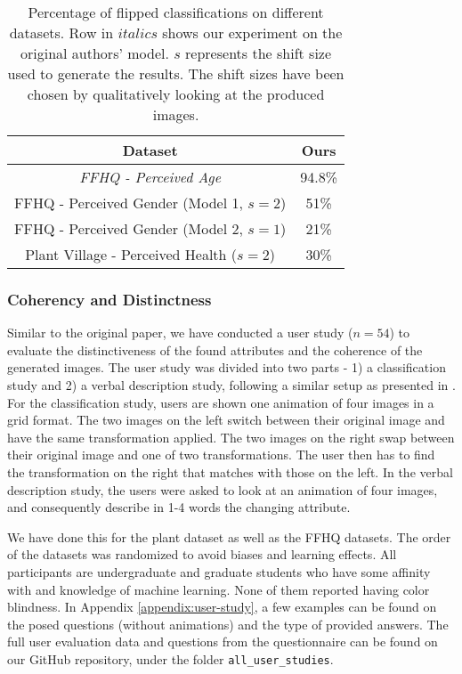 \begin{table}[h]
\centering
\begin{tabular}{ c | c{2cm} }
\toprule
\textbf{Dataset} & \textbf{Ours} \\
\midrule
\textit{FFHQ - Perceived Age} & 94.8\% \\
FFHQ - Perceived Gender (Model 1, $s=2$) & 51\% \\
FFHQ - Perceived Gender (Model 2, $s=1$) & 21\% \\
Plant Village - Perceived Health ($s=2$) & 30\% \\
\bottomrule
\end{tabular}
\caption{Percentage of flipped classifications on different datasets. Row in $italics$ shows our experiment on the original authors' model. $s$ represents the shift size used to generate the results. The shift sizes have been chosen by qualitatively looking at the produced images.}
\label{tab:sufficiency}
\end{table}


\subsubsection{Coherency and Distinctness}
Similar to the original paper, we have conducted a user study ($n=54$) to evaluate the distinctiveness of the found attributes and the coherence of the generated images. The user study was divided into two parts - 1) a classification study and 2) a verbal description study, following a similar setup as presented in \cite{yeh2020completenessaware}. For the classification study, users are shown one animation of four images in a grid format. The two images on the left switch between their original image and have the same transformation applied. The two images on the right swap between their original image and one of two transformations. The user then has to find the transformation on the right that matches with those on the left. In the verbal description study, the users were asked to look at an animation of four images, and consequently describe in 1-4 words the changing attribute.

We have done this for the plant dataset as well as the FFHQ datasets. The order of the datasets was randomized to avoid biases and learning effects. All participants are undergraduate and graduate students who have some affinity with and knowledge of machine learning. None of them reported having color blindness. In Appendix \ref{appendix:user-study}, a few examples can be found on the posed questions (without animations) and the type of provided answers. The full user evaluation data and questions from the questionnaire can be found on our GitHub repository, under the folder \texttt{all\_user\_studies}.


